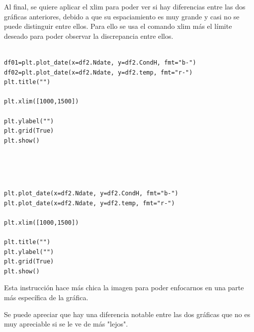 \documentclass{article}
\begin{document}
Al final, se quiere aplicar el xlim para poder ver si hay diferencias entre las dos gráficas anteriores, debido a que su espaciamiento es muy grande y casi no se puede distinguir entre ellos. Para ello se usa el comando xlim más el límite deseado para poder observar la discrepancia entre ellos.

\begin{verbatim}

df01=plt.plot_date(x=df2.Ndate, y=df2.CondH, fmt="b-")
df02=plt.plot_date(x=df2.Ndate, y=df2.temp, fmt="r-")
plt.title("")

plt.xlim([1000,1500])

plt.ylabel("")
plt.grid(True)
plt.show()

\end{verbatim}
\\
\\
\\


\begin{verbatim}
plt.plot_date(x=df2.Ndate, y=df2.CondH, fmt="b-")
plt.plot_date(x=df2.Ndate, y=df2.temp, fmt="r-")

plt.xlim([1000,1500])

plt.title("")
plt.ylabel("")
plt.grid(True)
plt.show()
\end{verbatim}

Esta instrucción hace más chica la imagen para poder enfocarnos en una parte más específica de la gráfica.

Se puede apreciar que hay una diferencia notable entre las dos gráficas que no es muy apreciable si se le ve de más "lejos".
\end{document}
